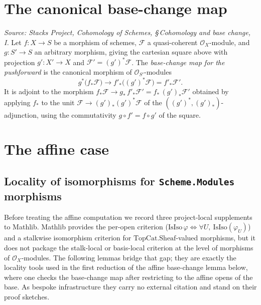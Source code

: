 \section{The canonical base-change map}

\begin{definition}\leanok
  \label{def:pushforward_base_change_map}
  \textit{Source: Stacks Project, Cohomology of Schemes, \S\,Cohomology and base
  change, I.}
  Let \(f : X \to S\) be a morphism of schemes, \(\mathcal{F}\) a quasi-coherent
  \(\mathcal{O}_X\)-module, and \(g : S' \to S\) an arbitrary morphism, giving the
  cartesian square above with projection \(g' : X' \to X\) and
  \(\mathcal{F}' = (g')^*\mathcal{F}\). The \emph{base-change map for the
  pushforward} is the canonical morphism of \(\mathcal{O}_{S'}\)-modules
  \[
    g^*\bigl(f_*\mathcal{F}\bigr) \longrightarrow f'_*\bigl((g')^*\mathcal{F}\bigr)
    = f'_*\mathcal{F}' .
  \]
  It is adjoint to the morphism
  \(f_*\mathcal{F} \to g_*\, f'_*\mathcal{F}' = f_*\,(g')_*\mathcal{F}'\) obtained
  by applying \(f_*\) to the unit
  \(\mathcal{F} \to (g')_*(g')^*\mathcal{F}\) of the
  \(((g')^*, (g')_*)\)-adjunction, using the commutativity
  \(g \circ f' = f \circ g'\) of the square.
\end{definition}

\section{The affine case}

\subsection{Locality of isomorphisms for \texttt{Scheme.Modules} morphisms}

Before treating the affine computation we record three project-local supplements
to Mathlib. Mathlib provides the per-open criterion
(\(\mathrm{IsIso}\,\varphi \iff \forall U,\ \mathrm{IsIso}(\varphi_U)\)) and a
stalkwise isomorphism criterion for \(\mathrm{TopCat.Sheaf}\)-valued morphisms, but
it does not package the stalk-local or basis-local criterion at the level of
morphisms of \(\mathcal{O}_X\)-modules. The following lemmas bridge that gap; they
are exactly the locality tools used in the first reduction of the affine
base-change lemma below, where one checks the base-change map after restricting to
the affine opens of the base. As bespoke infrastructure they carry no external
citation and stand on their proof sketches.

